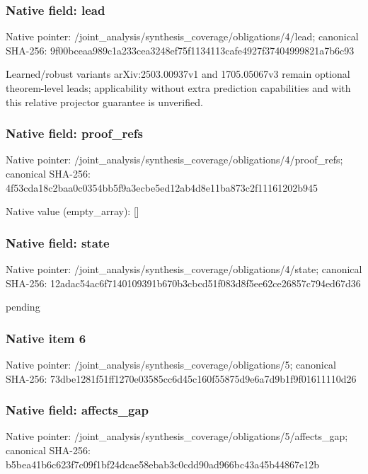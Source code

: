 \documentclass[10pt,a4paper]{article}
\begin{document}
\subsubsection{Native field: lead}
Native pointer: /joint\_\allowbreak{}analysis/synthesis\_\allowbreak{}coverage/obligations/4/lead; canonical SHA-256: 9f00bceaa989c1a233cea3248ef75f1134113cafe4927f37404999821a7b6c93

\begingroup\raggedright\sloppy Learned/\allowbreak{}robust variants arXiv:\allowbreak{}2503.00937v1 and 1705.05067v3 remain optional theorem-level leads;\allowbreak{} applicability without extra prediction capabilities and with this relative projector guarantee is unverified.\par\endgroup

\subsubsection{Native field: proof\_\allowbreak{}refs}
Native pointer: /joint\_\allowbreak{}analysis/synthesis\_\allowbreak{}coverage/obligations/4/proof\_\allowbreak{}refs; canonical SHA-256: 4f53cda18c2baa0c0354bb5f9a3ecbe5ed12ab4d8e11ba873c2f11161202b945

Native value (empty\_\allowbreak{}array): []

\subsubsection{Native field: state}
Native pointer: /joint\_\allowbreak{}analysis/synthesis\_\allowbreak{}coverage/obligations/4/state; canonical SHA-256: 12adac54ac6f7140109391b670b3cbcd51f083d8f5ee62ce26857c794ed67d36

\begingroup\raggedright\sloppy pending\par\endgroup

\subsubsection{Native item 6}
Native pointer: /joint\_\allowbreak{}analysis/synthesis\_\allowbreak{}coverage/obligations/5; canonical SHA-256: 73dbe1281f51ff1270e03585cc6d45c160f55875d9e6a7d9b1f9f01611110d26

\subsubsection{Native field: affects\_\allowbreak{}gap}
Native pointer: /joint\_\allowbreak{}analysis/synthesis\_\allowbreak{}coverage/obligations/5/affects\_\allowbreak{}gap; canonical SHA-256: b5bea41b6c623f7c09f1bf24dcae58ebab3c0cdd90ad966bc43a45b44867e12b
\end{document}
